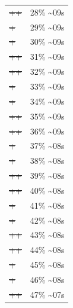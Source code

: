 \documentclass[12pt]{article}
\begin{document}
\begin{center}
\begin{tabular}{ll}
\sout{\sout{\sout{\sout{\sout{\sout{++}}}}}} & 28\% \textasciitilde{}09s\\
\sout{\sout{\sout{\sout{\sout{\sout{\sout{+}}}}}}} & 29\% \textasciitilde{}09s\\
\sout{\sout{\sout{\sout{\sout{\sout{\sout{+}}}}}}} & 30\% \textasciitilde{}09s\\
\sout{\sout{\sout{\sout{\sout{\sout{\sout{++}}}}}}} & 31\% \textasciitilde{}09s\\
\sout{\sout{\sout{\sout{\sout{\sout{\sout{++}}}}}}} & 32\% \textasciitilde{}09s\\
\sout{\sout{\sout{\sout{\sout{\sout{\sout{\sout{+}}}}}}}} & 33\% \textasciitilde{}09s\\
\sout{\sout{\sout{\sout{\sout{\sout{\sout{\sout{+}}}}}}}} & 34\% \textasciitilde{}09s\\
\sout{\sout{\sout{\sout{\sout{\sout{\sout{\sout{++}}}}}}}} & 35\% \textasciitilde{}09s\\
\sout{\sout{\sout{\sout{\sout{\sout{\sout{\sout{++}}}}}}}} & 36\% \textasciitilde{}09s\\
\sout{\sout{\sout{\sout{\sout{\sout{\sout{\sout{\sout{+}}}}}}}}} & 37\% \textasciitilde{}08s\\
\sout{\sout{\sout{\sout{\sout{\sout{\sout{\sout{\sout{+}}}}}}}}} & 38\% \textasciitilde{}08s\\
\sout{\sout{\sout{\sout{\sout{\sout{\sout{\sout{\sout{++}}}}}}}}} & 39\% \textasciitilde{}08s\\
\sout{\sout{\sout{\sout{\sout{\sout{\sout{\sout{\sout{++}}}}}}}}} & 40\% \textasciitilde{}08s\\
\sout{\sout{\sout{\sout{\sout{\sout{\sout{\sout{\sout{\sout{+}}}}}}}}}} & 41\% \textasciitilde{}08s\\
\sout{\sout{\sout{\sout{\sout{\sout{\sout{\sout{\sout{\sout{+}}}}}}}}}} & 42\% \textasciitilde{}08s\\
\sout{\sout{\sout{\sout{\sout{\sout{\sout{\sout{\sout{\sout{++}}}}}}}}}} & 43\% \textasciitilde{}08s\\
\sout{\sout{\sout{\sout{\sout{\sout{\sout{\sout{\sout{\sout{++}}}}}}}}}} & 44\% \textasciitilde{}08s\\
\sout{\sout{\sout{\sout{\sout{\sout{\sout{\sout{\sout{\sout{\sout{+}}}}}}}}}}} & 45\% \textasciitilde{}08s\\
\sout{\sout{\sout{\sout{\sout{\sout{\sout{\sout{\sout{\sout{\sout{+}}}}}}}}}}} & 46\% \textasciitilde{}08s\\
\sout{\sout{\sout{\sout{\sout{\sout{\sout{\sout{\sout{\sout{\sout{++}}}}}}}}}}} & 47\% \textasciitilde{}07s\\

\end{tabular}
\end{center}
\end{document}
